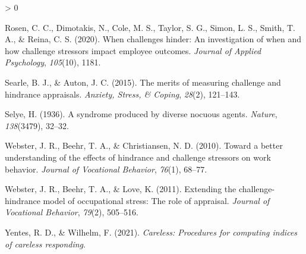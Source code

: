 \documentclass[
  english,
  man]{apa6}
\newlength{\cslhangindent}
\newenvironment{CSLReferences}[2] %
 {%
  \setlength{\parindent}{0pt}
  \ifodd #1 \everypar{\setlength{\hangindent}{\cslhangindent}}\ignorespaces\fi
  \ifnum #2 > 0
  \setlength{\parskip}{#2\baselineskip}
  \fi
 }%
 {}
\begin{document}
\begin{CSLReferences}{1}{0}
\leavevmode\hypertarget{ref-rosen2020challenges}{}%
Rosen, C. C., Dimotakis, N., Cole, M. S., Taylor, S. G., Simon, L. S., Smith, T. A., \& Reina, C. S. (2020). When challenges hinder: An investigation of when and how challenge stressors impact employee outcomes. \emph{Journal of Applied Psychology}, \emph{105}(10), 1181.

\leavevmode\hypertarget{ref-searle2015merits}{}%
Searle, B. J., \& Auton, J. C. (2015). The merits of measuring challenge and hindrance appraisals. \emph{Anxiety, Stress, \& Coping}, \emph{28}(2), 121--143.

\leavevmode\hypertarget{ref-selye1936syndrome}{}%
Selye, H. (1936). A syndrome produced by diverse nocuous agents. \emph{Nature}, \emph{138}(3479), 32--32.

\leavevmode\hypertarget{ref-webster2010toward}{}%
Webster, J. R., Beehr, T. A., \& Christiansen, N. D. (2010). Toward a better understanding of the effects of hindrance and challenge stressors on work behavior. \emph{Journal of Vocational Behavior}, \emph{76}(1), 68--77.

\leavevmode\hypertarget{ref-webster2011extending}{}%
Webster, J. R., Beehr, T. A., \& Love, K. (2011). Extending the challenge-hindrance model of occupational stress: The role of appraisal. \emph{Journal of Vocational Behavior}, \emph{79}(2), 505--516.

\leavevmode\hypertarget{ref-R-careless}{}%
Yentes, R. D., \& Wilhelm, F. (2021). \emph{Careless: Procedures for computing indices of careless responding}.

\end{CSLReferences}

\endgroup
\end{document}
